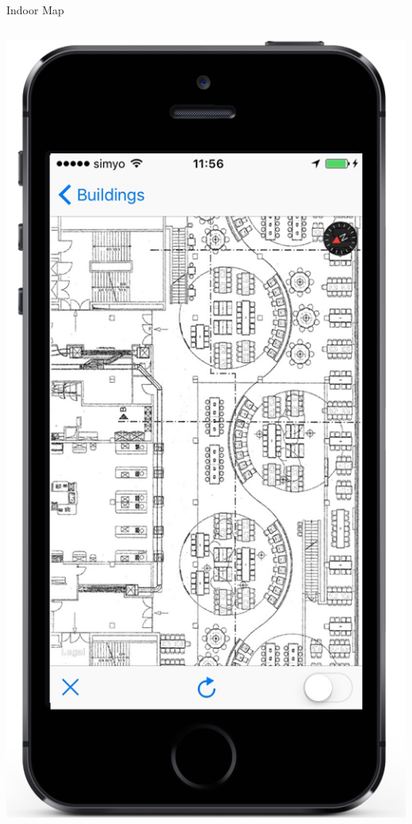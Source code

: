 \documentclass[11pt]{beamer}
\begin{document}
\begin{frame}{Indoor Map}
\begin{columns}[T]
\begin{column}{.4\textwidth}
  \includegraphics[scale=0.25]{mapisready}
  \end{column}
\end{columns}

\end{frame}
\end{document}
